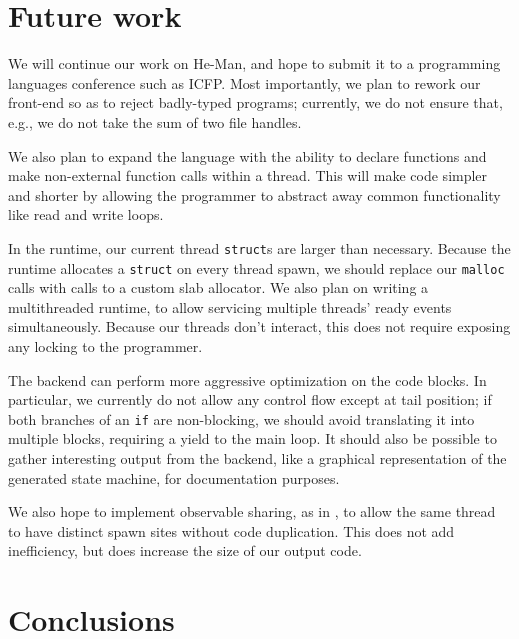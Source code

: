 \documentclass[preprint,11pt]{sigplanconf}
\renewcommand{\t}{\texttt}
\begin{document}

\section{Future work}

We will continue our work on He-Man, and hope to submit it to a programming
languages conference such as ICFP. Most importantly, we plan to rework our
front-end so as to reject badly-typed programs; currently, we do not ensure
that, e.g., we do not take the sum of two file handles.

We also plan to expand the language with the ability to declare functions and
make non-external function calls within a thread. This will make code simpler
and shorter by allowing the programmer to abstract away common functionality
like read and write loops.

In the runtime, our current thread \t{struct}s are larger than necessary.
Because the runtime allocates a \t{struct} on every thread spawn, we should
replace our \t{malloc} calls with calls to a custom slab allocator. We also plan
on writing a multithreaded runtime, to allow servicing multiple threads' ready
events simultaneously. Because our threads don't interact, this does not require
exposing any locking to the programmer.

The backend can perform more aggressive optimization on the code blocks. In
particular, we currently do not allow any control flow except at tail position;
if both branches of an \t{if} are non-blocking, we should avoid translating it
into multiple blocks, requiring a yield to the main loop. It should also be
possible to gather interesting output from the backend, like a graphical
representation of the generated state machine, for documentation purposes.

We also hope to implement observable sharing, as in \cite{Gill}, to allow the
same thread to have distinct spawn sites without code duplication. This does not
add inefficiency, but does increase the size of our output code. 

\section{Conclusions}

{}

\end{document}

